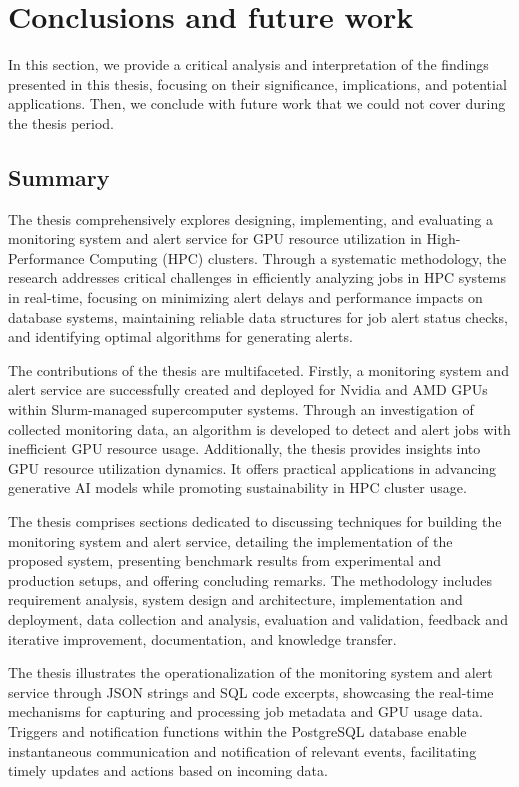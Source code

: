 \chapter{Conclusions and future work}
In this section, we provide a critical analysis and interpretation of the findings presented in this thesis, focusing on their significance, implications, and potential applications. Then, we conclude with future work that we could not cover during the thesis period.

\section{Summary}

The thesis comprehensively explores designing, implementing, and evaluating a monitoring system and alert service for GPU resource utilization in High-Performance Computing (HPC) clusters. Through a systematic methodology, the research addresses critical challenges in efficiently analyzing jobs in HPC systems in real-time, focusing on minimizing alert delays and performance impacts on database systems, maintaining reliable data structures for job alert status checks, and identifying optimal algorithms for generating alerts.

The contributions of the thesis are multifaceted. Firstly, a monitoring system and alert service are successfully created and deployed for Nvidia and AMD GPUs within Slurm-managed supercomputer systems. Through an investigation of collected monitoring data, an algorithm is developed to detect and alert jobs with inefficient GPU resource usage. Additionally, the thesis provides insights into GPU resource utilization dynamics. It offers practical applications in advancing generative AI models while promoting sustainability in HPC cluster usage.

The thesis comprises sections dedicated to discussing techniques for building the monitoring system and alert service, detailing the implementation of the proposed system, presenting benchmark results from experimental and production setups, and offering concluding remarks. The methodology includes requirement analysis, system design and architecture, implementation and deployment, data collection and analysis, evaluation and validation, feedback and iterative improvement, documentation, and knowledge transfer.

The thesis illustrates the operationalization of the monitoring system and alert service through JSON strings and SQL code excerpts, showcasing the real-time mechanisms for capturing and processing job metadata and GPU usage data. Triggers and notification functions within the PostgreSQL database enable instantaneous communication and notification of relevant events, facilitating timely updates and actions based on incoming data.

